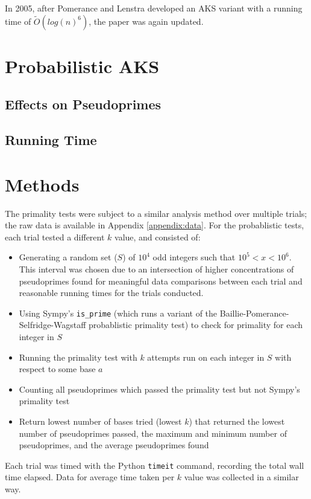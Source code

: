 \documentclass{article}
\begin{document}
In 2005, after Pomerance and Lenstra developed an AKS variant with a running time of $\widetilde{O}(log(n)^{6})$, the paper was again updated.

\section{Probabilistic AKS}

\subsection{Effects on Pseudoprimes}

\subsection{Running Time}

\section{Methods}
The primality tests were subject to a similar analysis method over multiple trials; the raw data is available in Appendix \ref{appendix:data}. For the probablistic tests, each trial tested a different $k$ value, and consisted of:

\begin{itemize}
    \item{Generating a random set ($S$) of $10^4$ odd integers such that $10^5 < x < 10^6$. This interval was chosen due to an intersection of higher concentrations of pseudoprimes found for meaningful data comparisons between each trial and reasonable running times for the trials conducted.}
    \item{Using Sympy's \texttt{is\_prime} (which runs a variant of the Baillie-Pomerance-Selfridge-Wagstaff probablistic primality test) to check for primality for each integer in $S$}
    \item{Running the primality test with $k$ attempts run on each integer in $S$ with respect to some base $a$}
    \item{Counting all pseudoprimes which passed the primality test but not Sympy's primality test}
    \item{Return lowest number of bases tried (lowest $k$) that returned the lowest number of pseudoprimes passed, the maximum and minimum number of pseudoprimes, and the average pseudoprimes found}
\end{itemize}

Each trial was timed with the Python \texttt{timeit} command, recording the total wall time elapsed. Data for average time taken per $k$ value was collected in a similar way. 
\end{document}
